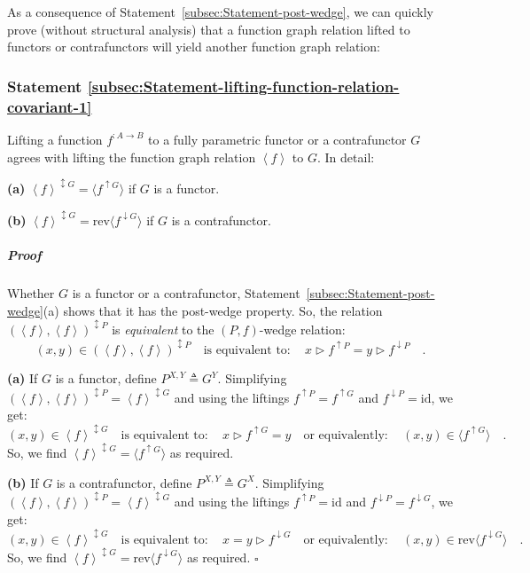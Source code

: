 As a consequence of Statement~\ref{subsec:Statement-post-wedge},
we can quickly prove (without structural analysis) that a function
graph relation lifted to functors or contrafunctors will yield another
function graph relation:

\subsubsection{Statement \label{subsec:Statement-lifting-function-relation-covariant-1}\ref{subsec:Statement-lifting-function-relation-covariant-1}}

Lifting a function $f^{:A\rightarrow B}$ to a fully parametric functor
or a contrafunctor $G$ agrees with lifting the function graph relation
$\left<f\right>$ to $G$. In detail: 

\textbf{(a)} $\left<f\right>^{\updownarrow G}=\langle f^{\uparrow G}\rangle$
if $G$ is a functor.

\textbf{(b)} $\left<f\right>^{\updownarrow G}=\text{rev}\langle f^{\downarrow G}\rangle$
if $G$ is a contrafunctor.

\subparagraph{Proof}

Whether $G$ is a functor or a contrafunctor, Statement~\ref{subsec:Statement-post-wedge}(a)
shows that it has the post-wedge property. So, the relation $(\left<f\right>,\left<f\right>)^{\updownarrow P}$
is \emph{equivalent} to the $\left(P,f\right)$-wedge relation:
\[
(x,y)\in(\left<f\right>,\left<f\right>)^{\updownarrow P}\quad\text{is equivalent to}:\quad x\triangleright f^{\uparrow P}=y\triangleright f^{\downarrow P}\quad.
\]

\textbf{(a)} If $G$ is a functor, define $P^{X,Y}\triangleq G^{Y}$.
Simplifying $(\left<f\right>,\left<f\right>)^{\updownarrow P}=\left<f\right>^{\updownarrow G}$
and using the liftings $f^{\uparrow P}=f^{\uparrow G}$ and $f^{\downarrow P}=\text{id}$,
we get:
\[
(x,y)\in\left<f\right>^{\updownarrow G}\quad\text{is equivalent to}:\quad x\triangleright f^{\uparrow G}=y\quad\text{or equivalently}:\quad(x,y)\in\langle f^{\uparrow G}\rangle\quad.
\]
So, we find $\left<f\right>^{\updownarrow G}=\langle f^{\uparrow G}\rangle$
as required.

\textbf{(b)} If $G$ is a contrafunctor, define $P^{X,Y}\triangleq G^{X}$.
Simplifying $(\left<f\right>,\left<f\right>)^{\updownarrow P}=\left<f\right>^{\updownarrow G}$
and using the liftings $f^{\uparrow P}=\text{id}$ and $f^{\downarrow P}=f^{\downarrow G}$,
we get:
\[
(x,y)\in\left<f\right>^{\updownarrow G}\quad\text{is equivalent to}:\quad x=y\triangleright f^{\downarrow G}\quad\text{or equivalently}:\quad(x,y)\in\text{rev}\langle f^{\downarrow G}\rangle\quad.
\]
 So, we find $\left<f\right>^{\updownarrow G}=\text{rev}\langle f^{\downarrow G}\rangle$
as required. $\square$

